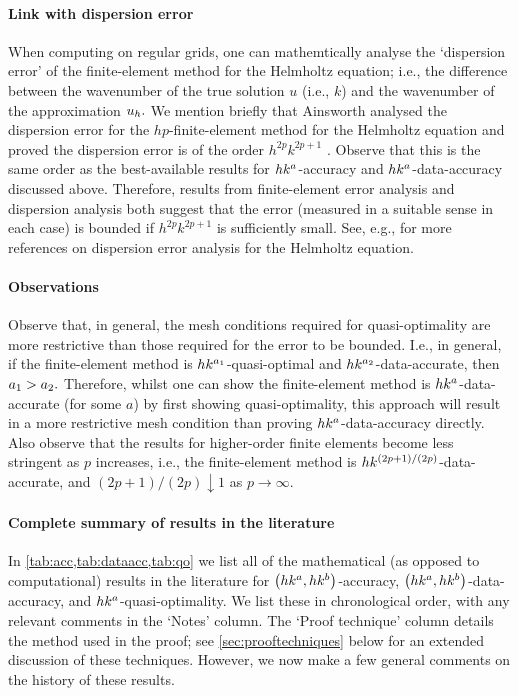 \paragraph{Link with dispersion error} When computing on regular grids, one can mathemtically analyse the `dispersion error' of the finite-element method for the Helmholtz equation; i.e., the difference between the wavenumber of the true solution $u$ (i.e., $k$) and the wavenumber of the approximation $u_{h}.$ We mention briefly that Ainsworth  analysed the dispersion error for the $hp$-finite-element method for the Helmholtz equation and proved the dispersion error is of the order $h^{2p}k^{2p+1}$ \cite[Equation (3.5)]{Ai:04}. Observe that this is the same order as the best-available results for $hk^{a}$-accuracy and $hk^{a}$-data-accuracy discussed above. Therefore, results from finite-element error analysis and dispersion analysis both suggest that the error (measured in a suitable sense in each case) is bounded if $h^{2p}k^{2p+1}$ is sufficiently small. See, e.g., \cite[Remark 5.3(a)]{DuWu:15} for more references on dispersion error analysis for the Helmholtz equation.

\paragraph{Observations} Observe that, in general, the mesh conditions required for quasi-optimality are more restrictive than those required for the error to be bounded. I.e., in general, if the finite-element method is $hk^{a_{1}}$-quasi-optimal and $hk^{a_{2}}$-data-accurate, then $a_{1} > a_{2}.$ Therefore, whilst one can show the finite-element method is $hk^{a}$-data-accurate (for some $a$) by first showing quasi-optimality, this approach will result in a more restrictive mesh condition than proving $hk^{a}$-data-accuracy directly. Also observe that the results for higher-order finite elements become less stringent as $p$ increases, i.e., the finite-element method is $hk^{(2p+1)/(2p)}$-data-accurate, and $(2p+1)/(2p) \downarrow 1$ as $p \rightarrow \infty.$

\paragraph{Complete summary of results in the literature} In \cref{tab:acc,tab:dataacc,tab:qo} we list all of the mathematical (as opposed to computational) results in the literature for $\hk{a}b$-accuracy, $\hk{a}b$-data-accuracy, and $hk^{a}$-quasi-optimality. We list these in chronological order, with any relevant comments in the `Notes' column. The `Proof technique' column details the method used in the proof; see \cref{sec:prooftechniques} below for an extended discussion of these techniques. However, we now make a few general comments on the history of these results.

